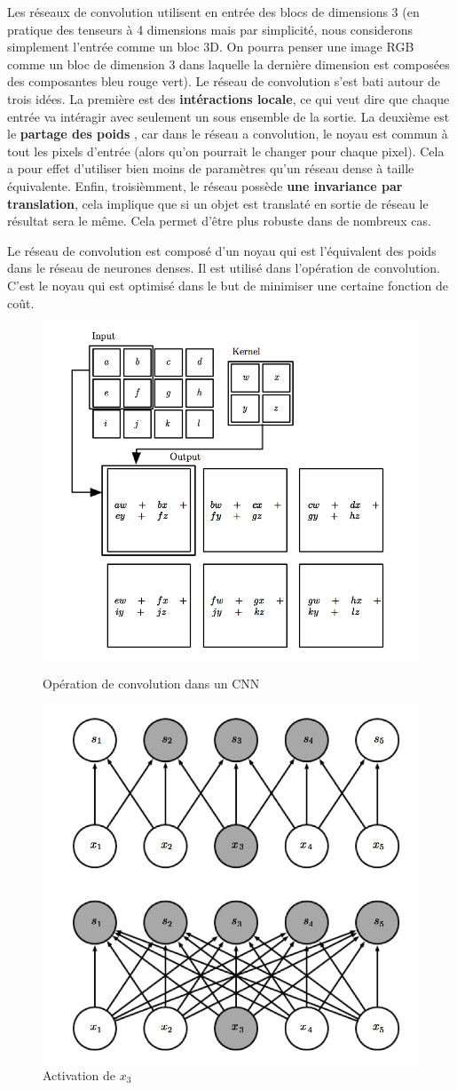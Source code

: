 Les réseaux de convolution utilisent en entrée des blocs de dimensions 3 (en pratique des tenseurs à 4 dimensions mais par simplicité, nous considerons simplement l'entrée comme un bloc 3D. On pourra penser une image RGB comme un bloc de dimension 3 dans laquelle la dernière dimension est composées des composantes bleu rouge vert). Le réseau de convolution s'est bati autour de trois idées. La première est des \textbf{intéractions locale}, ce qui veut dire que chaque entrée va intéragir avec seulement un sous ensemble de la sortie. La deuxième est le \textbf{partage des poids }, car dans le réseau a convolution, le noyau est commun à tout les pixels d'entrée (alors qu'on pourrait le changer pour chaque pixel). Cela a pour effet d'utiliser bien moins de paramètres qu'un réseau dense à taille équivalente. Enfin, troisièmment, le réseau possède \textbf{une invariance par translation}, cela implique que si un objet est translaté en sortie de réseau le résultat sera le même. Cela permet d'être plus robuste dans de nombreux cas.

Le réseau de convolution est composé d'un noyau qui est l'équivalent des poids dans le réseau de neurones denses. Il est utilisé dans l'opération de convolution. C'est le noyau qui est optimisé dans le but de minimiser une certaine fonction de coût.

\begin{figure}[h!]
\centering
\begin{minipage}{.5\textwidth}
  \centering
  \includegraphics[width=.4\linewidth]{./assets/DeepLearning/conv.png}
  \caption{Opération de convolution dans un CNN}
\end{minipage}%
\begin{minipage}{.5\textwidth}
  \centering
  \includegraphics[width=.4\linewidth]{./assets/DeepLearning/convVSdense.png}
  \caption{Activation de  $x_3$} 
\end{minipage}
\end{figure}

